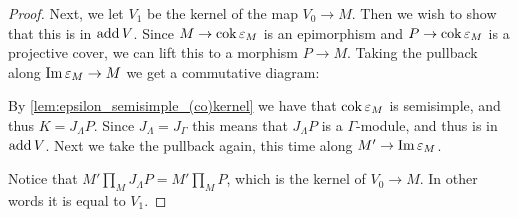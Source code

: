 \begin{theorem}
\begin{proof}
		Next, we let $V_1$ be the kernel of the map $V_0 \to M$. Then we wish to show that this is in $\operatorname{add} V$. Since $M \to \operatorname{cok}\varepsilon_M$ is an epimorphism and $P \to \operatorname{cok}\varepsilon_M$ is a projective cover, we can lift this to a morphism $P \to M$. Taking the pullback along $\operatorname{Im} \varepsilon_M \to M$ we get a commutative diagram:
		\begin{center}
		\end{center} 
		By \cref{lem:epsilon_semisimple_(co)kernel} we have that $ \operatorname{cok}\varepsilon_M $ is semisimple, and thus $K = J_\Lambda P$. Since $J_\Lambda=J_\Gamma$ this means that $J_\Lambda P$ is a $\Gamma$-module, and thus is in $\operatorname{add} V$. Next we take the pullback again, this time along $M' \to \operatorname{Im} \varepsilon_M$. 
		\begin{center}
		\end{center} 
		Notice that $M'\prod\limits_M J_\Lambda P = M'\prod\limits_M P$, which is the kernel of $V_0 \to M$. In other words it is equal to $V_1$.
		

\end{proof}
\end{theorem}
